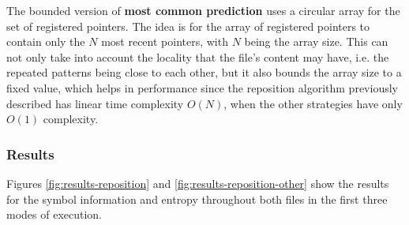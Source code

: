 \documentclass{article}
\begin{document}
The bounded version of \textbf{most common prediction} uses a circular array for the set of registered pointers.
The idea is for the array of registered pointers to contain only the $N$ most recent pointers, with $N$ being the array size.
This can not only take into account the locality that the file's content may have, i.e. the repeated patterns being close to each other, but it also bounds the array size to a fixed value, which helps in performance since the reposition algorithm previously described has linear time complexity $O(N)$, when the other strategies have only $O(1)$ complexity.

\subsubsection{Results}

Figures \ref{fig:results-reposition} and \ref{fig:results-reposition-other} show the results for the symbol information and entropy throughout both files in the first three modes of execution.
\end{document}
